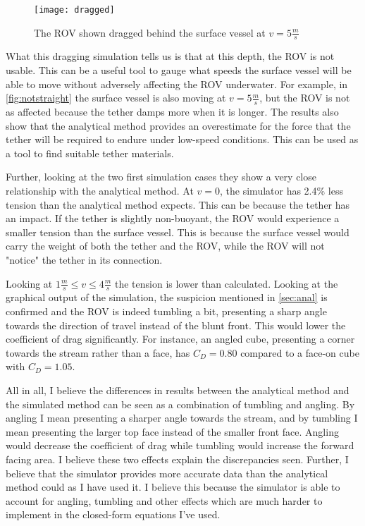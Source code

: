 \begin{figure}
	\centering
	\texttt{[image: dragged]}
	\caption{The ROV shown dragged behind the surface vessel at \(v=5\frac{m}{s}\)}
	\label{fig:dragged}
\end{figure}

What this dragging simulation tells us is that at this depth, the ROV is not usable. This can be a useful tool to gauge what speeds the surface vessel will be able to move without adversely affecting the ROV underwater. For example, in \cref{fig:notstraight} the surface vessel is also moving at \(v=5\frac m s\), but the ROV is not as affected because the tether damps more when it is longer. The results also show that the analytical method provides an overestimate for the force that the tether will be required to endure under low-speed conditions. This can be used as a tool to find suitable tether materials.

Further, looking at the two first simulation cases they show a very close relationship with the analytical method. At \(v=0\), the simulator has 2.4\% less tension than the analytical method expects. This can be because the tether has an impact. If the tether is slightly non-buoyant, the ROV would experience a smaller tension than the surface vessel. This is because the surface vessel would carry the weight of both the tether and the ROV, while the ROV will not "notice" the tether in its connection.

Looking at \(1\frac{m}{s} \leq v \leq 4\frac m s\) the tension is lower than calculated. Looking at the graphical output of the simulation, the suspicion mentioned in \cref{sec:anal} is confirmed and the ROV is indeed tumbling a bit, presenting a sharp angle towards the direction of travel instead of the blunt front. This would lower the coefficient of drag significantly. For instance, an angled cube, presenting a corner towards the stream rather than a face, has \(C_D = 0.80\) compared to a face-on cube with \(C_D=1.05\). 

All in all, I believe the differences in results between the analytical method and the simulated method can be seen as a combination of tumbling and angling. By angling I mean presenting a sharper angle towards the stream, and by tumbling I mean presenting the larger top face instead of the smaller front face. Angling would decrease the coefficient of drag while tumbling would increase the forward facing area. I believe these two effects explain the discrepancies seen. Further, I believe that the simulator provides more accurate data than the analytical method could as I have used it. I believe this because the simulator is able to account for angling, tumbling and other effects which are much harder to implement in the closed-form equations I've used. 

